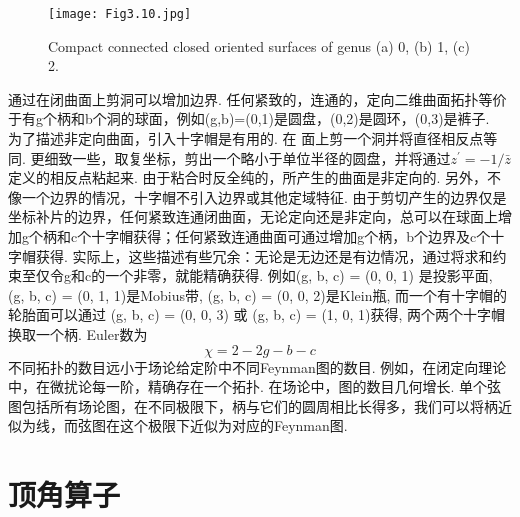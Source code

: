 \begin{figure}
	\begin{center}
		\texttt{[image: Fig3.10.jpg]}\\
		\caption{Compact connected closed oriented surfaces of genus (a) 0, (b) 1, (c) 2.}\label{Fig3.10}
	\end{center}
\end{figure}

通过在闭曲面上剪洞可以增加边界. 任何紧致的，连通的，定向二维曲面拓扑等价于有g个柄和b个洞的球面，例如(g,b)=(0,1)是圆盘，(0,2)是圆环，(0,3)是裤子. \\
为了描述非定向曲面，引入十字帽是有用的. 在 面上剪一个洞并将直径相反点等同. 更细致一些，取复坐标，剪出一个略小于单位半径的圆盘，并将通过$z^{\prime}=-1 / \bar{z}$ 定义的相反点粘起来. 由于粘合时反全纯的，所产生的曲面是非定向的. 另外，不像一个边界的情况，十字帽不引入边界或其他定域特征. 由于剪切产生的边界仅是坐标补片的边界，任何紧致连通闭曲面，无论定向还是非定向，总可以在球面上增加g个柄和c个十字帽获得；任何紧致连通曲面可通过增加g个柄，b个边界及c个十字帽获得. 实际上，这些描述有些冗余：无论是无边还是有边情况，通过将求和约束至仅令g和c的一个非零，就能精确获得. 例如(g, b, c) = (0, 0, 1) 是投影平面, (g, b, c) = (0, 1, 1)是Mobius带, (g, b, c) = (0, 0, 2)是Klein瓶, 而一个有十字帽的轮胎面可以通过
(g, b, c) = (0, 0, 3) 或 (g, b, c) = (1, 0, 1)获得, 两个两个十字帽换取一个柄.  Euler数为
\begin{equation}
\chi=2-2 g-b-c
\end{equation}
不同拓扑的数目远小于场论给定阶中不同Feynman图的数目. 例如，在闭定向理论中，在微扰论每一阶，精确存在一个拓扑. 在场论中，图的数目几何增长. 单个弦图包括所有场论图，在不同极限下，柄与它们的圆周相比长得多，我们可以将柄近似为线，而弦图在这个极限下近似为对应的Feynman图.


\section{顶角算子}%

